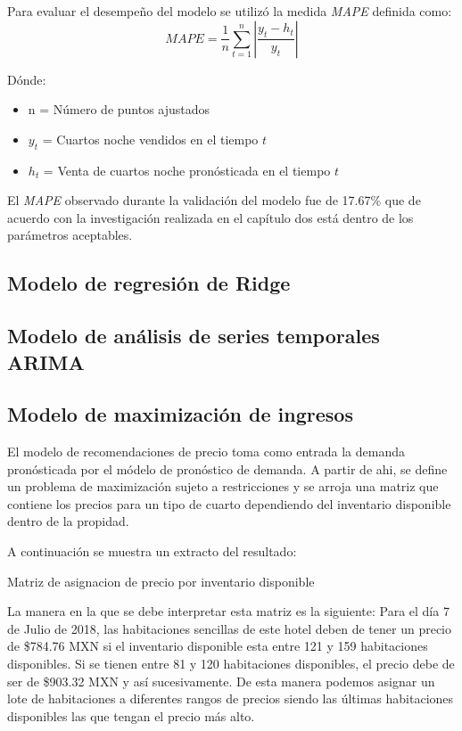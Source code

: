 Para evaluar el desempeño del modelo se utilizó la medida \emph{MAPE} definida como: $$MAPE=\frac{1}{n}\sum_{t=1}^{n}|\frac{y_t-h_t}{y_t}|$$

Dónde:
\begin{itemize}[noitemsep]
  \item n = Número de puntos ajustados
  \item $y_t$ = Cuartos noche vendidos en el tiempo $t$
  \item $h_t$ = Venta de cuartos noche pronósticada en el tiempo $t$
\end{itemize}


El \emph{MAPE} observado durante la validación del modelo fue de 17.67\% que de acuerdo con la investigación realizada en el capítulo dos está dentro de los parámetros aceptables.

\subsection*{Modelo de regresión de Ridge}

\subsection*{Modelo de análisis de series temporales ARIMA}

\subsection*{Modelo de maximización de ingresos}

El modelo de recomendaciones de precio toma como entrada la demanda pronósticada por el módelo de pronóstico de demanda. A partir de ahi, se define un problema de maximización sujeto a restricciones y se arroja una matriz que contiene los precios para un tipo de cuarto dependiendo del inventario disponible dentro de la propidad.

A continuación se muestra un extracto del resultado:

\begin{table}[H]
  \centering
  \par
  \caption{Matriz de asignacion de precio por inventario disponible}
\end{table}

La manera en la que se debe interpretar esta matriz es la siguiente: Para el día 7 de Julio de 2018, las habitaciones sencillas de este hotel deben de tener un precio de \$784.76 MXN si el inventario disponible esta entre 121 y 159 habitaciones disponibles. Si se tienen entre 81 y 120 habitaciones disponibles, el precio debe de ser de \$903.32 MXN y así sucesivamente. De esta manera podemos asignar un lote de habitaciones a diferentes rangos de precios siendo las últimas habitaciones disponibles las que tengan el precio más alto.



